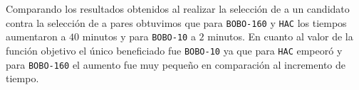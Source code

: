 Comparando los resultados obtenidos al realizar la selección de a un candidato contra la selección de a pares obtuvimos que para \texttt{BOBO-160} y \texttt{HAC} los tiempos aumentaron a $40$ minutos y para \texttt{BOBO-10} a $2$ minutos. En cuanto al valor de la función objetivo el único beneficiado fue \texttt{BOBO-10} ya que para \texttt{HAC} empeoró y para \texttt{BOBO-160} el aumento fue muy pequeño en comparación al incremento de tiempo.


